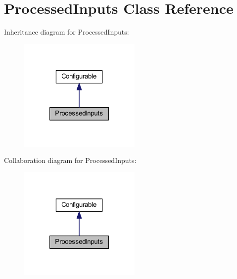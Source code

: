 \hypertarget{class_processed_inputs}{
\section{\-Processed\-Inputs \-Class \-Reference}
\label{class_processed_inputs}
}


\-Inheritance diagram for \-Processed\-Inputs\-:\nopagebreak
\begin{figure}[H]
\begin{center}
\leavevmode
\includegraphics[width=168pt]{class_processed_inputs__inherit__graph}
\end{center}
\end{figure}


\-Collaboration diagram for \-Processed\-Inputs\-:\nopagebreak
\begin{figure}[H]
\begin{center}
\leavevmode
\includegraphics[width=168pt]{class_processed_inputs__coll__graph}
\end{center}
\end{figure}
